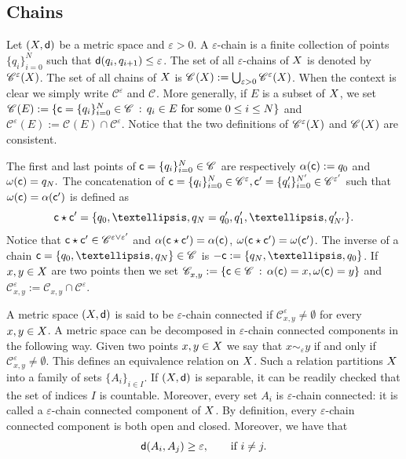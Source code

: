 \documentclass[12pt]{amsart}
\newcommand{\sfd}{{\sf d}}
\newcommand{\X}{{\rm X}}
\theoremstyle{definition}
\newcommand{\sfc}{{\sf c}}
\newcommand{\Chain}[1]{\mathscr{C}^{#1}}
\begin{document}
\subsection{Chains}
Let $(\X,\sfd)$ be a metric space and $\varepsilon > 0$.
A $\varepsilon$-chain is a finite collection of points $\{ q_i \}_{i=0}^N$ such that $\sfd(q_i,q_{i+1})\le \varepsilon$. The set of all $\varepsilon$-chains of $\X$ is denoted by $\Chain{\varepsilon}(\X)$. The set of all chains of $\X$ is $\Chain{}(\X) := \bigcup_{\varepsilon > 0} \Chain{\varepsilon}(\X)$. When the context is clear we simply write $\Chain{\varepsilon}$ and $\Chain{}$.
More generally, if $E$ is a subset of $\X$, we set $\Chain{}(E) := \{ \sfc = \{q_i\}_{i=0}^N \in \Chain{} \,:\, q_i \in E \text{ for some } 0\le i \le N\}$ and $\Chain{\varepsilon}(E) := \Chain{}(E) \cap \Chain{\varepsilon}$. Notice that the two definitions of $\Chain{\varepsilon}(\X)$ and $\Chain{}(\X)$ are consistent.

The first and last points of $\sfc = \{q_i\}_{i=0}^N \in \Chain{}$ are respectively $\alpha(\sfc) := q_0$ and $\omega(\sfc) = q_N.$
The concatenation of $\sfc = \{q_i\}_{i=0}^N \in \Chain{\varepsilon}, \sfc' =\{q_i'\}_{i=0}^{N'} \in \Chain{\varepsilon'}$ such that $\omega(\sfc) = \alpha(\sfc')$ is defined as
\begin{equation}
    \label{eq:defin_concatenation}
    \sfc\star \sfc' = \{q_0,\ldots,q_N = q_0',q_1',\ldots,q_{N'}'\}.
\end{equation}
Notice that $\sfc\star \sfc' \in \Chain{\varepsilon \vee \varepsilon'}$ and $\alpha(\sfc\star \sfc') = \alpha(\sfc)$, $\omega(\sfc\star \sfc') = \omega(\sfc')$. The inverse of a chain $\sfc = \{q_0,\ldots,q_N\} \in \Chain{}$ is $-\sfc := \{q_N,\ldots,q_0\}$.
If $x,y\in \X$ are two points then we set $\Chain{}_{x,y} := \{\sfc \in \Chain{} \, : \, \alpha(\sfc) = x, \omega(\sfc) = y\}$ and $\Chain{\varepsilon}_{x,y} := \Chain{}_{x,y} \cap \Chain{\varepsilon}$. 

A metric space $(\X,\sfd)$ is said to be $\varepsilon$-chain connected if $\Chain{\varepsilon}_{x,y} \neq \emptyset$ for every $x,y \in \X$. A metric space can be decomposed in $\varepsilon$-chain connected components in the following way. Given two points $x,y\in \X$ we say that $x \sim_\varepsilon y$ if and only if $\Chain{\varepsilon}_{x,y} \neq \emptyset$. This defines an equivalence relation on $\X$. Such a relation partitions $\X$ into a family of sets $\{A_i\}_{i \in I}$. If $(\X,\sfd)$ is separable, it can be readily checked that the set of indices $I$ is countable. Moreover, every set $A_i$ is $\varepsilon$-chain connected: it is called a $\varepsilon$-chain connected component of $\X$. 
By definition, every $\varepsilon$-chain connected component is both open and closed.
Moreover, we have that 
\begin{equation}
\label{eq:chain_connected_components_positive_distance}
    \sfd(A_i,A_j) \ge \varepsilon,\qquad \text{if }i \neq j.
\end{equation}
\end{document}
